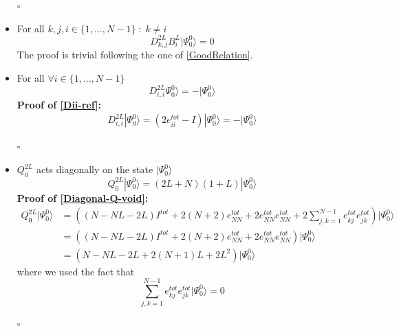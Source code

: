 \documentclass[10pt]{article}
\numberwithin{equation}{section}
\numberwithin{equation}{subsection}
\begin{document}
\begin{itemize}
\begin{flushright}
	$\square$
\end{flushright}
\item For all $k,j,i\in\{1,\ldots,N-1\}\;:\;k\neq i$
\begin{equation}\label{DijBk-different}
	D_{k,j}^{2L}B_{i}^{L}|\Psi_{0}^{0}\rangle=0
\end{equation}
The proof is trivial following the one of \eqref{GoodRelation}. 
\item For all $ \forall i\in \{1,\ldots,N-1\}$
\begin{equation}\label{Dii-ref}
	D_{i,i}^{2L}\Psi_{0}^{0}\rangle=-|\Psi_{0}^{0}\rangle
\end{equation}
\textbf{Proof of \eqref{Dii-ref}:}
\begin{align}
	D_{i,i}^{2L}|\Psi_{0}^{0}\rangle=	(2e_{ii}^{tot}-I)|\Psi_{0}^{0}\rangle=-|\Psi_{0}^{0}\rangle
\end{align}
\begin{flushright}
	$\square$
\end{flushright}
\item $Q_{0}^{2L}$ acts diagonally on the state $|\Psi_{0}^{0}\rangle$
\begin{equation}\label{Diagonal-Q-void}
	Q_{0}^{2L}|\Psi_{0}^{0}\rangle=(2L+N)(1+L)|\Psi_{0}^{0}\rangle
\end{equation}
\textbf{Proof of \eqref{Diagonal-Q-void}:}
\begin{align}
	Q_{0}^{2L}|\Psi_{0}^{0}\rangle&=\left((N-NL-2L)I^{tot}+2(N+2)e_{NN}^{tot}+2e_{NN}^{tot}e_{NN}^{tot}+2\sum_{j,k=1}^{N-1}e_{kj}^{tot}e_{jk}^{tot}\right)|\Psi_{0}^{0}\rangle\\&=
	\left((N-NL-2L)I^{tot}+2(N+2)e_{NN}^{tot}+2e_{NN}^{tot}e_{NN}^{tot}\right)|\Psi_{0}^{0}\rangle
	\\&=
	(N-NL-2L+2(N+1)L+2L^{2})|\Psi_{0}^{0}\rangle
\end{align}
where we used the fact that 
\begin{equation}
	\sum_{j,k=1}^{N-1}e_{kj}^{tot}e_{jk}^{tot}|\Psi_{0}^{0}\rangle=0
\end{equation}
\begin{flushright}
	$\square$
\end{flushright}
\end{itemize}
\end{document}
